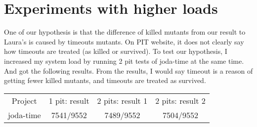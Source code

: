 \documentclass[a4paper]{article}
\begin{document}
\section{Experiments with higher loads}

One of our hypothesis is that the difference of killed mutants from our result to Laura's is caused by timeouts mutants. On PIT website, it does not clearly say how timeouts are treated (as killed or survived). To test our hypothesis, I increased my system load by running 2 pit tests of joda-time at the same time. And got the following results. From the results, I would say timeout is a reason of getting fewer killed mutants, and timeouts are treated as survived.

\begin{tabular}{|c|c|c|c|}
	\hline
	Project & 1 pit: result & 2 pits: result 1 & 2 pits: result 2 \\
	joda-time & 7541/9552 & 7489/9552 & 7504/9552 \\
	\hline
\end{tabular}
 
\end{document}
